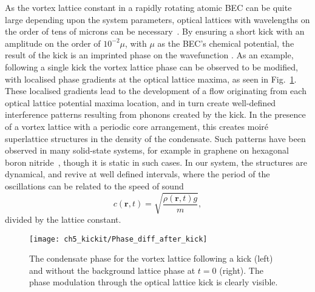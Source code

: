 As the vortex lattice constant in a rapidly rotating atomic BEC can be quite large depending upon the system parameters, optical lattices with wavelengths on the order of tens of microns can be necessary~\cite{BEC:Fallani_optexp_2005, AO:Williams_optexp_2008}. By ensuring a short kick with an amplitude on the order of $10^{-2} \mu $, with $\mu$ as the BEC's chemical potential, the result of the kick is an imprinted phase on the wavefunction \cite{Vtx:Dobrek_pra_1999}. As an example, following a single kick the vortex lattice phase can be observed to be modified, with localised phase gradients at the optical lattice maxima, as seen in Fig.~\ref{fig:Phase_diff_after_kick}. These localised gradients lead to the development of a flow originating from each optical lattice potential maxima location, and in turn create well-defined interference patterns resulting from phonons created by the kick. In the presence of a vortex lattice with a periodic core arrangement, this creates moir\'e superlattice structures \cite{SS:Murata_acsn_2010} in the density of the condensate. Such patterns have been observed in many solid-state systems, for example in graphene on hexagonal boron nitride~\cite{SS:Yankowitz_natphys_2012}, though it is static in such cases. In our system, the structures are dynamical, and revive at well defined intervals, where the period of the oscillations can be related to the speed of sound
\begin{equation}
c(\textbf{r},t) = \sqrt{\frac{\rho (\textbf{r},t) g}{m}},
\end{equation}
divided by the lattice constant.

\begin{figure}
    \centering
    \texttt{[image: ch5\_kickit/Phase\_diff\_after\_kick]}
    \caption[Phase modulation following a kick.]{The condensate phase for the vortex lattice following a kick (left) and without the background lattice phase at $t=0$ (right). The phase modulation through the optical lattice kick is clearly visible.}
    \label{fig:Phase_diff_after_kick}
\end{figure}


